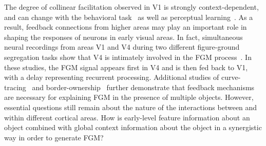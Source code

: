 The degree of collinear facilitation observed in V1 is strongly context-dependent, and can change with the behavioral task~\citep{Li_etal04, Li_etal06} as well as perceptual learning~\citep{Li_etal08a, Yan_etal14}. As a result, feedback connections from higher areas may play an important role in shaping the responses of neurons in early visual areas. In fact, simultaneous neural recordings from areas V1 and V4 during two different figure-ground segregation tasks show that V4 is intimately involved in the FGM process~\citep{Poort_etal12, Chen_etal14}. In these studies, the FGM signal appears first in V4 and is then fed back to V1, with a delay representing recurrent processing. Additional studies of curve-tracing~\citep{Roelfsema_etal98} and border-ownership~\citep{Zhou_etal00, Qiu_etal07, Zhang_vonderHeydt10} further demonstrate that feedback mechanisms are necessary for explaining FGM in the presence of multiple objects. However, essential questions still remain about the nature of the interactions between and within different cortical areas. How is early-level feature information about an object combined with global context information about the object in a synergistic way in order to generate FGM?

